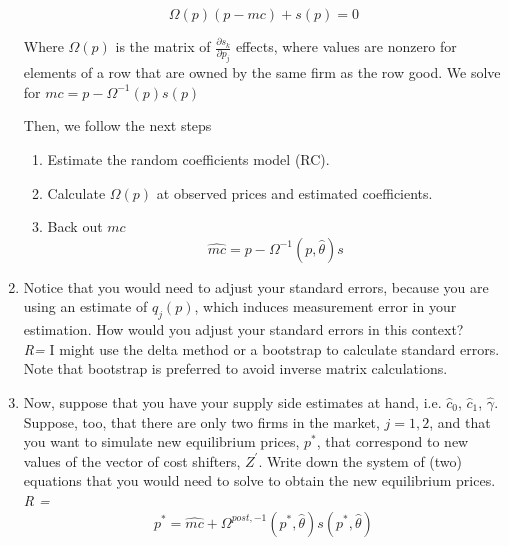 \documentclass[english,12pt]{article}
\begin{document}
\begin{enumerate}
\[
\Omega(p)(p-mc) + s(p) = 0
\]

Where $\Omega(p)$ is the matrix of $\frac{\partial s_k}{\partial p_j} $ effects, where values are nonzero for elements of a row that are owned by the same firm as the row good. We solve for $mc = p - \Omega^{-1}(p) s(p)$

Then, we follow the next steps
\begin{enumerate}
\item Estimate the random coefficients model (RC).
\item Calculate $\Omega(p)$ at observed prices and estimated coefficients.
\item Back out $mc$
\[
\hat{mc} = p - \Omega^{-1}(p, \hat{\theta}) s
\]
\end{enumerate}	
	
	\item Notice that you would need to adjust your standard errors, because you are using an estimate of $q_j(p)$, which induces measurement error in your estimation. How would you adjust your standard errors in this context? \\
	
\textit{R=} I might use the delta method or a bootstrap to calculate standard errors. Note that bootstrap is preferred to avoid inverse matrix calculations.
	
	\item Now, suppose that you have your supply side estimates at hand, i.e. $\hat c_0$, $\hat c_1$, $\hat\gamma$. Suppose, too, that there are only two firms in the market, $j=1,2$, and that you want to simulate new equilibrium prices, $p^*$, that correspond to new values of the vector of cost shifters, $Z^\prime$. Write down the system of (two) equations that you would need to solve to obtain the new equilibrium prices. \\
\textit{R = }
\[
p^* = \hat{mc} + \Omega^{post,-1} (p^*, \hat{\theta}) s(p^*, \hat{\theta})
\]	
	
\end{enumerate}
\end{document}
